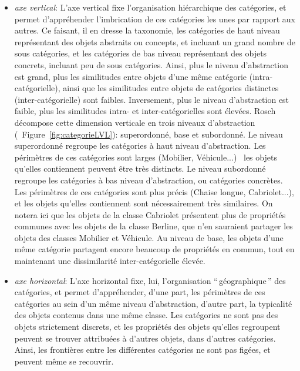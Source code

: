\begin{itemize}
\item \textit{axe vertical}: L'axe vertical fixe l'organisation hiérarchique des catégories, et permet d'appréhender l'imbrication de ces catégories les unes par rapport aux autres. Ce faisant, il en dresse la taxonomie, les catégories de haut niveau représentant des objets abstraits ou concepts, et incluant un grand nombre de sous catégories, et les catégories de bas niveau représentant des objets concrets, incluant peu de sous catégories. Ainsi, plus le niveau d'abstraction est grand, plus les similitudes entre objets d'une même catégorie (intra-catégorielle), ainsi que les similitudes entre objets de catégories distinctes (inter-catégorielle) sont faibles. Inversement, plus le niveau d'abstraction est faible, plus les similitudes intra- et inter-catégorielles sont élevées. Rosch décompose cette dimension verticale en trois niveaux d'abstraction (\cf~Figure~\ref{fig:categorieLVL}): superordonné, base et subordonné. Le niveau superordonné regroupe les catégories à haut niveau d'abstraction. Les périmètres de ces catégories sont larges (Mobilier, Véhicule...) \ie~les objets qu'elles contiennent peuvent être très distincts. Le niveau subordonné regroupe les catégories à bas niveau d'abstraction, ou catégories concrètes. Les périmètres de ces catégories sont plus précis (Chaise longue, Cabriolet...), et les objets qu'elles contiennent sont nécessairement très similaires. On notera ici que les objets de la classe Cabriolet présentent plus de propriétés communes avec les objets de la classe Berline, que n'en sauraient partager les objets des classes Mobilier et Véhicule. Au niveau de base, les objets d'une même catégorie partagent encore beaucoup de propriétés en commun, tout en maintenant une dissimilarité inter-catégorielle élevée.
\item \textit{axe horizontal}: L'axe horizontal fixe, lui, l'organisation ``\,géographique\,'' des catégories, et permet d'appréhender, d'une part, les périmètres de ces catégories au sein d'un même niveau d'abstraction, d'autre part, la typicalité des objets contenus dans une même classe. Les catégories ne sont pas des objets strictement discrets, et les propriétés des objets qu'elles regroupent peuvent se trouver attribuées à d'autres objets, dans d'autres catégories. Ainsi, les frontières entre les différentes catégories ne sont pas figées, et peuvent même se recouvrir.
\end{itemize}


